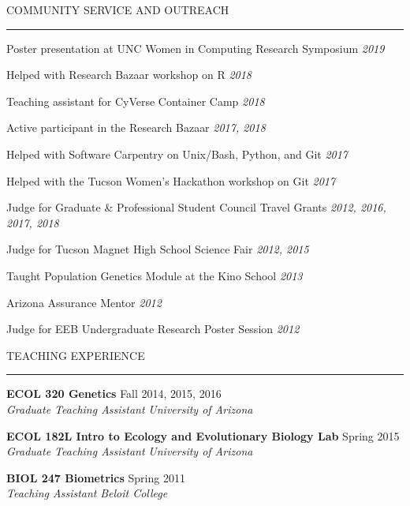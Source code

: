 \documentclass{resume} %
\renewenvironment{rSection}[1]{
\sectionskip
\textcolor{RoyalPurple}{\MakeUppercase{#1}}
\sectionlineskip
\hrule
\begin{list}{}{
\setlength{\leftmargin}{1.5em}
}
\item[]
}{
\end{list}
}
\begin{document}
\begin{rSection}{Community Service and Outreach}

\item Poster presentation at UNC Women in Computing Research Symposium \hfill {\em 2019}
\item Helped with Research Bazaar workshop on R \hfill {\em 2018}
\item Teaching assistant for CyVerse Container Camp \hfill {\em 2018}
\item Active participant in the Research Bazaar \hfill {\em 2017, 2018}
\item Helped with Software Carpentry on Unix/Bash, Python, and Git \hfill {\em 2017}
\item Helped with the Tucson Women’s Hackathon workshop on Git \hfill {\em 2017}
\item Judge for Graduate \& Professional Student Council Travel Grants \hfill {\em 2012, 2016, 2017, 2018}
\item Judge for Tucson Magnet High School Science Fair \hfill {\em 2012, 2015}
\item Taught Population Genetics Module at the Kino School \hfill {\em 2013}
\item Arizona Assurance Mentor \hfill {\em 2012}
\item Judge for EEB Undergraduate Research Poster Session \hfill {\em 2012}

\end{rSection}


\begin{rSection}{Teaching Experience}

{\bf ECOL 320 Genetics} \hfill Fall 2014, 2015, 2016 \\ 
{\em Graduate Teaching Assistant} \hfill {\em University of Arizona}

{\bf ECOL 182L Intro to Ecology and Evolutionary Biology Lab} \hfill Spring 2015 \\ 
{\em Graduate Teaching Assistant} \hfill {\em University of Arizona}

{\bf BIOL 247 Biometrics} \hfill Spring 2011 \\ 
{\em Teaching Assistant} \hfill {\em Beloit College}


\end{rSection}
\end{document}
